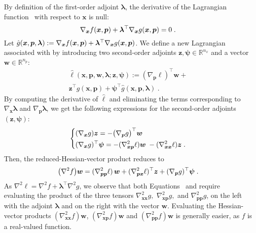 By definition of the first-order adjoint $\bm{\lambda}$,
the derivative of the Lagrangian function~ with respect to $\bm{x}$ is null:
\begin{equation}
  \label{eq:first_order}
    \grad{f}{\bm{x}}(\bm{x}, \bm{p}) + \bm{\lambda}^\top \grad{g}{\bm{x}}(\bm{x}, \bm{p})  = 0
    \; .
\end{equation}
Let $\hat{g}(\bm{x}, \bm{p}, \bm{\lambda}) :=  \grad{f}{\bm{x}}(\bm{x}, \bm{p}) + \bm{\lambda}^\top \grad{g}{\bm{x}}(\bm{x}, \bm{p})$.
We define a new Lagrangian associated with 
by introducing two second-order adjoints $\bm{z}, \bm{\psi} \in \mathbb{R}^{n_x}$
and a vector $\bm{w} \in \mathbb{R}^{n_p}$:
\begin{multline}
  \hat{\ell}(\bm{x}, \bm{p}, \bm{w}, \bm{\lambda}; \bm{z}, \bm{\psi}) :=
  (\nabla_{\bm{p}} \ell)^\top \bm{w} + \\ \bm{z}^\top g(\bm{x}, \bm{p})
  + \bm{\psi}^\top \hat{g}(\bm{x}, \bm{p}, \bm{\lambda})
  \; .
\end{multline}
By computing the derivative of $\hat{\ell}$ and eliminating
the terms corresponding to $\nabla_{\bm{x}} \bm{\lambda}$
and $\nabla_{\bm{p}} \bm{\lambda}$, we get the following
expressions for the second-order adjoints $(\bm{z}, \bm{\psi})$:
\begin{equation}
  \label{eq:socadjoint}
  \left\{
  \begin{aligned}
    & (\grad{g}{\bm{x}}) \bm{z} = - \big(\nabla_{\bm{p}} g\big)^\top \bm{w} \\
    & (\grad{g}{\bm{x}})^\top \bm{\psi} =
    - (\nabla^2_{\bm{x}\bm{p}} \ell) \bm{w} \;
    - (\nabla^2_{\bm{x}\bm{x}} \ell) \bm{z} \; .
  \end{aligned}
  \right.
\end{equation}
Then, the reduced-Hessian-vector product reduces to
\begin{equation}
  \label{eq:hessvecprod}
  \big(\nabla^2 f\big) \bm{w} = (\hhess{\ell}{\bm{p}\bm{p}}) \, \bm{w}
  +  (\hhess{\ell}{\bm{p}\bm{x}})^\top \bm{z}
  +  (\grad{g}{\bm{p}})^\top\bm{\psi}
  \;.
\end{equation}
As $\nabla^2 \ell = \nabla^2 f + \bm{\lambda}^\top \nabla^2 g$,
we observe that both Equations~
and  require evaluating the product
of the three tensors $\nabla^2_{\bm{x}\bm{x}} g,$ $\nabla^2_{\bm{x}\bm{p}} g
,$ and $\nabla^2_{\bm{p}\bm{p}} g$, on the left with the adjoint
$\bm{\lambda}$ and on the right with the vector $\bm{w}$.
Evaluating the Hessian-vector products
$(\nabla^2_{\bm{x}\bm{x}} f) \bm{w}$, $(\nabla^2_{\bm{x}\bm{p}}f)\bm{w}$ and $(\nabla^2_{\bm{p}\bm{p}} f) \bm{w}$
is generally easier, as $f$ is a real-valued function.

